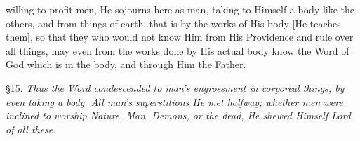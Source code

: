 willing to profit men, He sojourns here as man, taking to Himself a body like the others, and from things of earth, that is by the works of His body [He teaches them], so that they who would not know Him from His Providence and rule over all things, may even from the works done by His actual body know the Word of God which is in the body, and through Him the Father.


§15. \emph{Thus the Word condescended to man’s engrossment in corporeal things, by even taking a body. All man’s superstitions He met halfway; whether men were inclined to worship Nature, Man, Demons, or the dead, He shewed Himself Lord of all these.}

